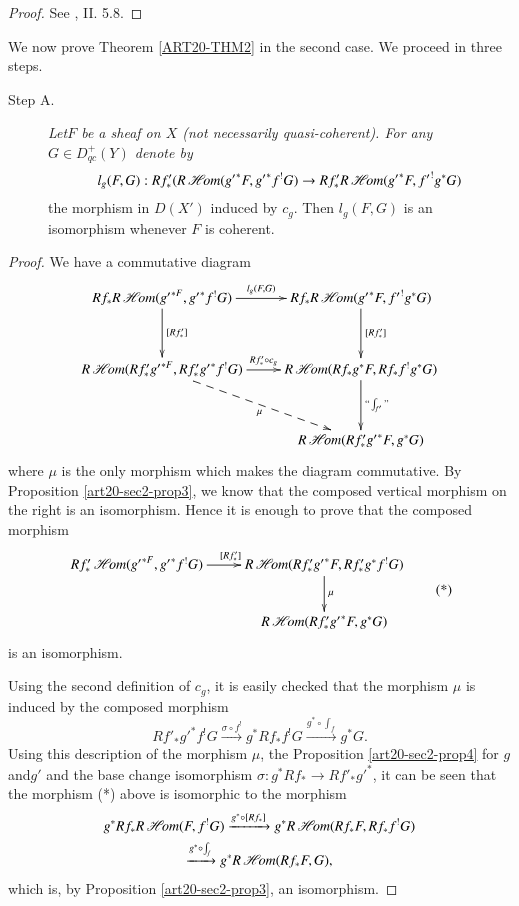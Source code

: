 \begin{proof}
See \cite{art20-key1}, II. 5.8.
\end{proof}

We now prove Theorem \ref{ART20-THM2} in the second case. We proceed in three steps.
\begin{description}
\item[Step A.] {\em Let\pageoriginale $F$ be a sheaf on $X$ (not necessarily quasi-coherent). For any $G\in D^{+}_{qc}(Y)$ denote by}
{\fontsize{10pt}{12pt}\selectfont
$$
l_{g}(F,G):Rf'_{*}(R\operatorname{\mathscr{H}\!\textit{om}}({g'}^{*}F,{g'}^{*}f^{!}G)\to Rf'_{*}R\operatorname{\mathscr{H}\!\textit{om}}({g'}^{*}F, {f'}^{!}g^{*}G)
$$}\relax
the morphism in $D(X')$ induced by $c_{g}$. Then $l_{g}(F,G)$ is an isomorphism whenever $F$ is coherent.
\end{description}

\begin{proof}
We have a commutative diagram
\[
\xymatrix@R=1.2cm{
Rf_{*}R\scrHom({g'}^{*F},{g'}^{*}f^{!}G)\ar[d]^-{[Rf'_{*}]}\ar[r]^-{l_{g}(F,G)} & Rf_{*}R\scrHom({g'}^{*}F,{f'}^{!}g^{*}G)\ar[d]^-{[Rf'_{*}]}\\
R\scrHom(Rf'_{*}{g'}^{*F},Rf'_{*}{g'}^{*}f^{!}G)\ar[r]^-{Rf'_{*}\circ c_{g}}\ar@{-->}[dr]_-{\mu} & R\scrHom(Rf_{*}g^{*}F,Rf_{*}f^{!}g^{*}G)\ar[d]^-{\text{``}\int_{f'}\text{''}}\\
 & R\scrHom(Rf'_{*}{g'}^{*}F,g^{*}G)
}
\]
where $\mu$ is the only morphism which makes the diagram commutative. By Proposition \ref{art20-sec2-prop3}, we know that the composed vertical morphism on the right is an isomorphism. Hence it is enough to prove that the composed morphism
\begin{equation*}
\vcenter{\xymatrix{
Rf'_{*}\scrHom({g'}^{*F},{g'}^{*}f^{!}G)\ar[r]^{[Rf'_{*}]} & R\scrHom(Rf'_{*}{g'}^{*}F,Rf'_{*}g^{*}f^{!}G)\ar[d]^-{\mu}\\
 & R\scrHom(Rf'_{*}{g'}^{*}F, g^{*}G)
}}\tag{*}
\end{equation*}
is an isomorphism.

Using the second definition of $c_{g}$, it is easily checked that the morphism $\mu$ is induced by the composed morphism
$$
Rf'_{*}{g'}^{*}f^{!}G\xrightarrow{\sigma\circ f^{!}}g^{*}Rf_{*}f^{!}G\xrightarrow{g^{*}\circ \int_{f}}g^{*}G.
$$
Using this description of the morphism $\mu$, the Proposition \ref{art20-sec2-prop4} for $g$ and\pageoriginale $g'$ and the base change isomorphism $\sigma:g^{*}Rf_{*}\to Rf'_{*}{g'}^{*}$, it can be seen that the morphism (*) above is isomorphic to the morphism 
\begin{gather*}
g^{*}Rf_{*}R\operatorname{\mathscr{H}\!\textit{om}}(F,f^{!}G)\xrightarrow{g^{*}\circ [Rf_{*}]}g^{*}R\operatorname{\mathscr{H}\!\textit{om}}(Rf_{*}F,Rf_{*}f^{!}G)\\
\xrightarrow{g^{*}\circ \int_{f}}g^{*}R\operatorname{\mathscr{H}\!\textit{om}}(Rf_{*}F,G),
\end{gather*}
which is, by Proposition \ref{art20-sec2-prop3}, an isomorphism.
\end{proof}

